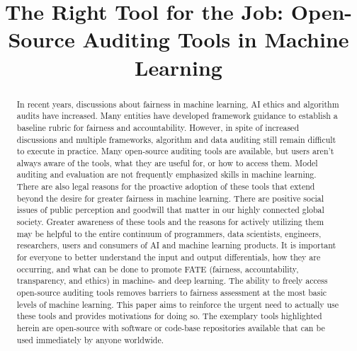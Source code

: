 \documentclass[conference]{IEEEtran}
\begin{document}
\title{The Right Tool for the Job: Open-Source Auditing Tools in Machine Learning\\
}

\author{

}

\maketitle

\begin{abstract}
In recent years, discussions about fairness in machine learning, AI ethics and algorithm audits have increased. Many entities have developed framework guidance to establish a baseline rubric for fairness and accountability. However, in spite of increased discussions and multiple frameworks, algorithm and data auditing still remain difficult to execute in practice.
Many open-source auditing tools are available, but users aren't always aware of the tools, what they are useful for, or how to access them. Model auditing and evaluation are not frequently emphasized skills in machine learning.
There are also legal reasons for the proactive adoption of these tools that extend beyond the desire for greater fairness in machine learning. There are positive social issues of public perception and goodwill that matter in our highly connected global society. 
Greater awareness of these tools and the reasons for actively utilizing them may be helpful to the entire continuum of programmers, data scientists, engineers, researchers, users and consumers of AI and machine learning products. It is important for everyone to better understand the input and output differentials, how they are occurring, and what can be done to promote FATE (fairness, accountability, transparency, and ethics) in machine- and deep learning.
The ability to freely access open-source auditing tools removes barriers to fairness assessment at the most basic levels of machine learning.
This paper aims to reinforce the urgent need to actually use these tools and provides motivations for doing so. The exemplary tools highlighted herein are open-source with software or code-base repositories available that can be used immediately by anyone worldwide.

\end{abstract}
\end{document}

